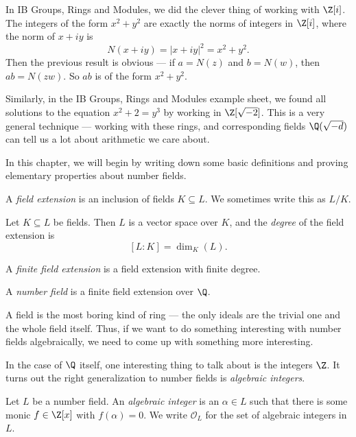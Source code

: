 \documentclass[a4paper]{article}
\begin{document}
In IB Groups, Rings and Modules, we did the clever thing of working with $\Z[i]$. The integers of the form $x^2 + y^2$ are exactly the norms of integers in $\Z[i]$, where the norm of $x + iy$ is
\[
  N(x + iy) = |x + iy|^2 = x^2 + y^2.
\]
Then the previous result is obvious --- if $a = N(z)$ and $b = N(w)$, then $ab = N(zw)$. So $ab$ is of the form $x^2 + y^2$.

Similarly, in the IB Groups, Rings and Modules example sheet, we found all solutions to the equation $x^2 + 2 = y^3$ by working in $\Z[\sqrt{-2}]$. This is a very general technique --- working with these rings, and corresponding fields $\Q(\sqrt{-d})$ can tell us a lot about arithmetic we care about.

In this chapter, we will begin by writing down some basic definitions and proving elementary properties about number fields.

\begin{defi}
  A \emph{field extension} is an inclusion of fields $K \subseteq L$. We sometimes write this as $L/K$.
\end{defi}

\begin{defi}
  Let $K \subseteq L$ be fields. Then $L$ is a vector space over $K$, and the \emph{degree} of the field extension is
  \[
    [L:K] = \dim_K (L).
  \]
\end{defi}

\begin{defi}
  A \emph{finite field extension} is a field extension with finite degree.
\end{defi}

\begin{defi}
  A \emph{number field} is a finite field extension over $\Q$.
\end{defi}

A field is the most boring kind of ring --- the only ideals are the trivial one and the whole field itself. Thus, if we want to do something interesting with number fields algebraically, we need to come up with something more interesting.

In the case of $\Q$ itself, one interesting thing to talk about is the integers $\Z$. It turns out the right generalization to number fields is \emph{algebraic integers}.

\begin{defi}
  Let $L$ be a number field. An \emph{algebraic integer} is an $\alpha \in L$ such that there is some monic $f \in \Z[x]$ with $f(\alpha) = 0$. We write $\mathcal{O}_L$ for the set of algebraic integers in $L$.
\end{defi}
\end{document}
